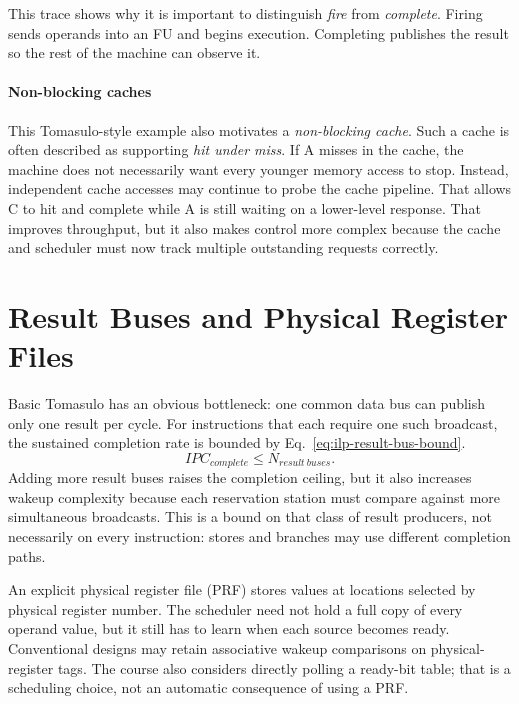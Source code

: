 This trace shows why it is important to distinguish \textit{fire} from \textit{complete}.
Firing sends operands into an FU and begins execution.
Completing publishes the result so the rest of the machine can observe it.

\paragraph{Non-blocking caches}\label{par:ilp-tomasulo-nonblocking}
This Tomasulo-style example also motivates a \textit{non-blocking cache}.
Such a cache is often described as supporting \textit{hit under miss}.
If A misses in the cache, the machine does not necessarily want every younger memory access to stop.
Instead, independent cache accesses may continue to probe the cache pipeline.
That allows C to hit and complete while A is still waiting on a lower-level response.
That improves throughput, but it also makes control more complex because the cache and scheduler must now track multiple outstanding requests correctly.


\section{Result Buses and Physical Register Files}\label{sec:ilp-result-bus-prf}
Basic Tomasulo has an obvious bottleneck: one common data bus can publish only one result per cycle.
For instructions that each require one such broadcast, the sustained completion rate is bounded by Eq.~\eqref{eq:ilp-result-bus-bound}.
\begin{equation}\label{eq:ilp-result-bus-bound}
    IPC_{complete} \le N_{result\ buses}.
\end{equation}
Adding more result buses raises the completion ceiling, but it also increases wakeup complexity because each reservation station must compare against more simultaneous broadcasts.
This is a bound on that class of result producers, not necessarily on every instruction: stores and branches may use different completion paths.

An explicit physical register file (PRF) stores values at locations selected by physical register number.
The scheduler need not hold a full copy of every operand value, but it still has to learn when each source becomes ready.
Conventional designs may retain associative wakeup comparisons on physical-register tags.
The course also considers directly polling a ready-bit table; that is a scheduling choice, not an automatic consequence of using a PRF.

